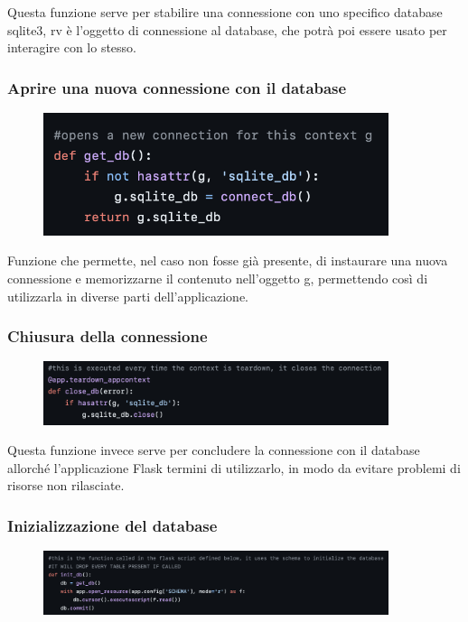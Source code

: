 \documentclass{article}
\begin{document}
Questa funzione serve per stabilire una connessione con uno specifico database sqlite3, rv è l’oggetto di connessione al database, che potrà poi essere usato per interagire con lo stesso.

\subsubsection{Aprire una nuova connessione con il database}
\begin{figure}[H]
    \centering
    \includegraphics[width=0.9\textwidth]{images/apertura_connessione_db.png}
\end{figure}

Funzione che permette, nel caso non fosse già presente, di instaurare una nuova connessione e memorizzarne il contenuto nell’oggetto g, permettendo così di utilizzarla in diverse parti dell’applicazione.

\subsubsection{Chiusura della connessione}
\begin{figure}[H]
    \centering
    \includegraphics[width=0.9\textwidth]{images/chiusura_connessione_db.png}
\end{figure}

Questa funzione invece serve per concludere la connessione con il database allorché l’applicazione Flask termini di utilizzarlo, in modo da evitare problemi di risorse non rilasciate.

\subsubsection{Inizializzazione del database}
\begin{figure}[H]
    \centering
    \includegraphics[width=0.9\textwidth]{images/inzializzazione_db.png}
\end{figure}
\end{document}
